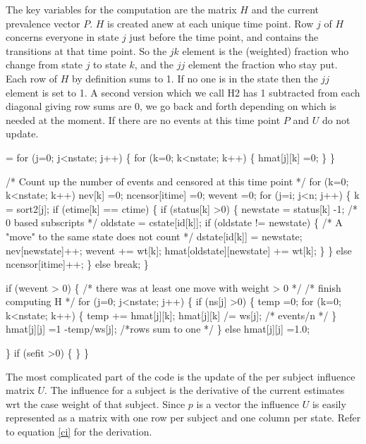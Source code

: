 \documentclass{article}
\begin{document}
The key variables for the computation are the matrix $H$ and the
current prevalence vector $P$.
$H$ is created anew at each unique time point.
Row $j$ of $H$ concerns everyone in state $j$ just before the time point,
and contains the transitions at that time point.
So the $jk$ element is the (weighted) fraction who change from state $j$
to state $k$, and the $jj$ element the fraction who stay put.
Each row of $H$ by definition sums to 1.  
If no one is in the state then the $jj$ element is set to 1.
A second version which we call H2 has 1 subtracted from each diagonal giving
row sums are 0, we go back and
forth depending on which is needed at the moment.
If there are no events at this time point $P$ and $U$ do not update.
\begin{nwchunk}
=
 for (j=0; j<nstate; j++) \{
     for (k=0; k<nstate; k++) \{
         hmat[j][k] =0;
     \}
  \}
 
 /* Count up the number of events and censored at this time point */
 for (k=0; k<nstate; k++) nev[k] =0;
 ncensor[itime] =0;
 wevent =0;
 for (j=i; j<n; j++) \{
     k = sort2[j];
     if (etime[k] == ctime) \{
         if (status[k] >0) \{
             newstate = status[k] -1;  /* 0 based subscripts */
             oldstate = cstate[id[k]];
             if (oldstate != newstate) \{
                 /* A "move" to the same state does not count */
                 dstate[id[k]] = newstate;
                 nev[newstate]++;
                 wevent += wt[k];
                 hmat[oldstate][newstate] += wt[k];
             \}
         \}
         else ncensor[itime]++;
     \}
     else break;
  \}
         
 if (wevent > 0) \{  /* there was at least one move with weight > 0 */
     /* finish computing H */
     for (j=0; j<nstate; j++) \{
         if (ns[j] >0) \{
             temp =0;
             for (k=0; k<nstate; k++) \{
                 temp += hmat[j][k];
                 hmat[j][k] /= ws[j];  /* events/n */
             \}
             hmat[j][j] =1 -temp/ws[j]; /*rows sum to one */
         \}
         else hmat[j][j] =1.0; 
  
     \}
     if (sefit >0) \{
     \}
 \}
\end{nwchunk}

The most complicated part of the code is the update of the
per subject influence matrix $U$.
The influence for a subject is the derivative of the current
estimates wrt the case weight of that subject.  Since $p$ is a
vector the influence $U$ is easily represented as a matrix with one row
per subject and one column per state. 
Refer to equation \eqref{ci} for the derivation.
\end{document}
